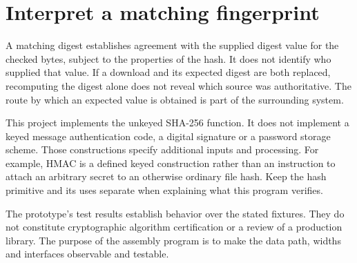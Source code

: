 \section{Interpret a matching fingerprint}
A matching digest establishes agreement with the supplied digest value for the checked
bytes, subject to the properties of the hash. It does not identify who supplied that
value. If a download and its expected digest are both replaced, recomputing the digest
alone does not reveal which source was authoritative. The route by which an expected
value is obtained is part of the surrounding system.

This project implements the unkeyed SHA-256 function. It does not implement a keyed
message authentication code, a digital signature or a password storage scheme. Those
constructions specify additional inputs and processing. For example, HMAC is a defined
keyed construction rather than an instruction to attach an arbitrary secret to an
otherwise ordinary file hash. Keep the hash primitive and its uses separate when
explaining what this program verifies.

The prototype's test results establish behavior over the stated fixtures. They do not
constitute cryptographic algorithm certification or a review of a production library.
The purpose of the assembly program is to make the data path, widths and interfaces
observable and testable.
